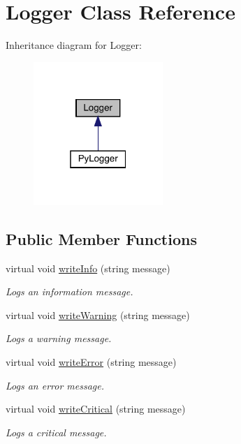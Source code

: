 \hypertarget{class_logger}{}\section{Logger Class Reference}
\label{class_logger}


Inheritance diagram for Logger\+:\nopagebreak
\begin{figure}[H]
\begin{center}
\leavevmode
\includegraphics[width=139pt]{class_logger__inherit__graph}
\end{center}
\end{figure}
\subsection*{Public Member Functions}
\begin{DoxyCompactItemize}
\item 
virtual void \hyperlink{class_logger_af0f328114c079a74bbe248e0bb2e3c88}{write\+Info} (string message)
\begin{DoxyCompactList}\small\item\em Logs an information message. \end{DoxyCompactList}\item 
virtual void \hyperlink{class_logger_a58e0b78e7be20e3769d58b5b8a2686bb}{write\+Warning} (string message)
\begin{DoxyCompactList}\small\item\em Logs a warning message. \end{DoxyCompactList}\item 
virtual void \hyperlink{class_logger_aed1644bc348e328cf0c3dc3e199ce908}{write\+Error} (string message)
\begin{DoxyCompactList}\small\item\em Logs an error message. \end{DoxyCompactList}\item 
virtual void \hyperlink{class_logger_afb8e520f94b5438bc39013c14549f271}{write\+Critical} (string message)
\begin{DoxyCompactList}\small\item\em Logs a critical message. \end{DoxyCompactList}\end{DoxyCompactItemize}


